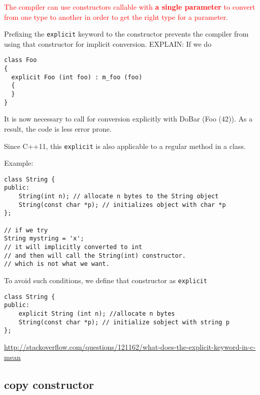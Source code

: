 \textcolor{red}{The compiler can use constructors callable with {\bf a single
parameter} to convert from one type to another in order to get the right type
for a parameter.}

Prefixing the \verb!explicit! keyword to the constructor prevents the compiler
from using that constructor for implicit conversion.
EXPLAIN: If we do
\begin{verbatim}
class Foo
{
  explicit Foo (int foo) : m_foo (foo) 
  {
  }
}
\end{verbatim}
It is now necessary to call for conversion explicitly with
DoBar (Foo (42)). As a result, the code is less error prone.

Since C++11, this \verb!explicit! is also applicable to a regular method in a class.

Example: 
\begin{verbatim}
class String {
public:
    String(int n); // allocate n bytes to the String object
    String(const char *p); // initializes object with char *p
};

// if we try
String mystring = 'x';
// it will implicitly converted to int 
// and then will call the String(int) constructor.  
// which is not what we want.

\end{verbatim}
To avoid such conditions, we define that constructor as \verb!explicit!
\begin{verbatim}
class String {
public:
    explicit String (int n); //allocate n bytes
    String(const char *p); // initialize sobject with string p
};
\end{verbatim}

\url{http://stackoverflow.com/questions/121162/what-does-the-explicit-keyword-in-c-mean}

\subsection{copy constructor}
\label{sec:copy-constructor}

